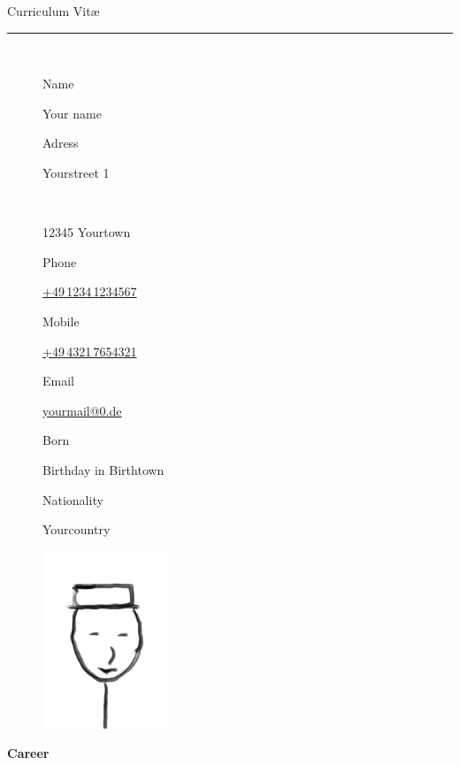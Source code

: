 \documentclass{scrartcl}
\date{}
\newcommand{\colorOne}{mycolor}
\newlength{\boxA}\settowidth{\boxA}{\textbf{Computer Skills}}
\newlength{\boxB}\settowidth{\boxB}{So lange muss diese Zeile sein oder sogar länger, mal gucken noch}
\newcommand{\NewData}[2]{\noindent \parbox{\boxA}{#1}\hspace{1em}#2\vspace{0.5em}}
\newcommand{\NewEntry}[2]{\noindent \parbox[t]{\boxA}{#1}\hspace{1em}\parbox[t]{\boxB}{#2}}
\begin{document}
    \pagestyle{empty}
    \noindent \textcolor{\colorOne}{\Large Curriculum Vit\ae}\vspace{-0.27em}
    \\
    {\rule{\textwidth}{0.04em}
    \\ \vspace{-1.3em}
    \begin{figure}[htbp]
        \begin{minipage}{0.7\textwidth}
            \NewData{Name}{Your name}
            
            \NewData{Adress}{Yourstreet 1\\ \hspace{0.5em} \parbox{\boxA}{~}\hspace{1em}12345 Yourtown}
            
            \NewData{Phone}{\href{tel:+4912341234567}{+49\,1234\,1234567}}
            
            \NewData{Mobile}{\href{tel:+4943217654321}{+49\,4321\,7654321}}
            
            \NewData{Email}{\href{mailto:yourmail@0.de}{yourmail@0.de}}
            
            \NewData{Born}{Birthday in Birthtown}
            
            
            \NewData{Nationality}{Yourcountry}
            
        \end{minipage}
        \hspace{2.2em}
        \begin{minipage}{0.2\textwidth}
            \centering
            \includegraphics[width=38mm]{photoA.jpg}
        \end{minipage}
    \end{figure}

\vspace{1em}

\NewEntry{\textcolor{\colorOne}{\textbf{Career}}}{~}

}
\end{document}
